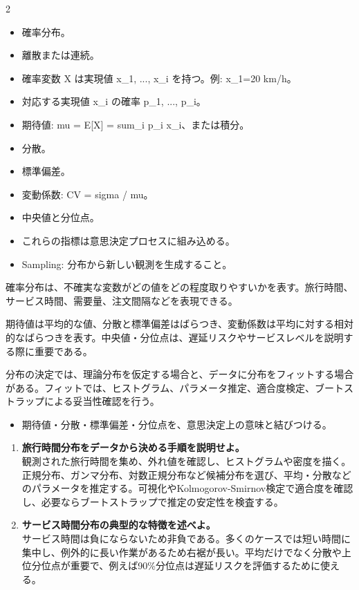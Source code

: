 \clearpage
{}
\begin{multicols}{2}\footnotesize\raggedcolumns
{}
\begin{itemize}
\item 確率分布。
\item 離散または連続。
\item 確率変数 X は実現値 x\_1, ..., x\_i を持つ。例: x\_1=20 km/h。
\item 対応する実現値 x\_i の確率 p\_1, ..., p\_i。
\item 期待値: mu = E[X] = sum\_i p\_i x\_i、または積分。
\item 分散。
\item 標準偏差。
\item 変動係数: CV = sigma / mu。
\item 中央値と分位点。
\item これらの指標は意思決定プロセスに組み込める。
\item Sampling: 分布から新しい観測を生成すること。
\end{itemize}
確率分布は、不確実な変数がどの値をどの程度取りやすいかを表す。旅行時間、サービス時間、需要量、注文間隔などを表現できる。\par

期待値は平均的な値、分散と標準偏差はばらつき、変動係数は平均に対する相対的なばらつきを表す。中央値・分位点は、遅延リスクやサービスレベルを説明する際に重要である。\par

分布の決定では、理論分布を仮定する場合と、データに分布をフィットする場合がある。フィットでは、ヒストグラム、パラメータ推定、適合度検定、ブートストラップによる妥当性確認を行う。\par
{}
\begin{itemize}
\item 期待値・分散・標準偏差・分位点を、意思決定上の意味と結びつける。
\end{itemize}
\begin{enumerate}
\item \textbf{旅行時間分布をデータから決める手順を説明せよ。}\\観測された旅行時間を集め、外れ値を確認し、ヒストグラムや密度を描く。正規分布、ガンマ分布、対数正規分布など候補分布を選び、平均・分散などのパラメータを推定する。可視化やKolmogorov-Smirnov検定で適合度を確認し、必要ならブートストラップで推定の安定性を検査する。
\item \textbf{サービス時間分布の典型的な特徴を述べよ。}\\サービス時間は負にならないため非負である。多くのケースでは短い時間に集中し、例外的に長い作業があるため右裾が長い。平均だけでなく分散や上位分位点が重要で、例えば90\%分位点は遅延リスクを評価するために使える。
\end{enumerate}
\end{multicols}


